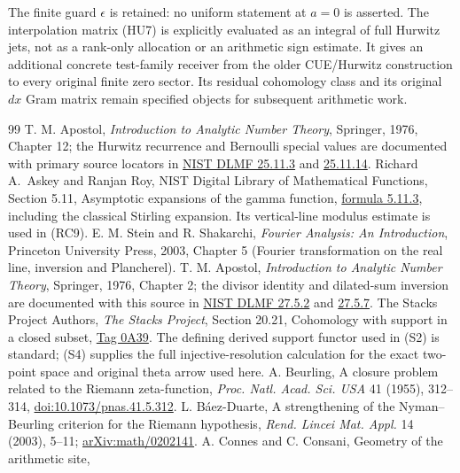 \documentclass[11pt]{article}
\begin{document}
The finite guard $\epsilon$ is retained: no uniform statement at
$a=0$ is asserted. The interpolation matrix (HU7) is explicitly
evaluated as an integral of full Hurwitz jets, not as a rank-only
allocation or an arithmetic sign estimate. It gives an additional
concrete test-family receiver from the older CUE/Hurwitz construction
to every original finite zero sector. Its residual cohomology class
and its original $dx$ Gram matrix remain specified objects for
subsequent arithmetic work.

\begin{thebibliography}{99}
 T. M. Apostol, \emph{Introduction to Analytic
Number Theory}, Springer, 1976, Chapter 12; the Hurwitz recurrence
and Bernoulli special values are documented with primary source
locators in
\href{https://dlmf.nist.gov/25.11.E3}{NIST DLMF 25.11.3} and
\href{https://dlmf.nist.gov/25.11.E14}{25.11.14}.
 Richard A.~Askey and Ranjan Roy,
NIST Digital Library of Mathematical Functions,
Section 5.11, Asymptotic expansions of the gamma function,
\href{https://dlmf.nist.gov/5.11.E3}{formula 5.11.3}, including the
classical Stirling expansion. Its vertical-line modulus estimate
is used in (RC9).
 E. M. Stein and R. Shakarchi,
\emph{Fourier Analysis: An Introduction}, Princeton University
Press, 2003, Chapter 5 (Fourier transformation on the real line,
inversion and Plancherel).
 T. M. Apostol, \emph{Introduction to Analytic
Number Theory}, Springer, 1976, Chapter 2; the divisor identity and
dilated-sum inversion are documented with this source in
\href{https://dlmf.nist.gov/27.5.E2}{NIST DLMF 27.5.2} and
\href{https://dlmf.nist.gov/27.5.E7}{27.5.7}.
 The Stacks Project Authors, \emph{The Stacks Project},
Section 20.21, Cohomology with support in a closed subset,
\href{https://stacks.math.columbia.edu/tag/0A39}{Tag 0A39}.
The defining derived support functor used in (S2) is standard;
(S4) supplies the full injective-resolution calculation for the exact
two-point space and original theta arrow used here.
 A. Beurling, A closure problem related to the Riemann
zeta-function, \emph{Proc. Natl. Acad. Sci. USA} 41 (1955), 312--314,
\href{https://doi.org/10.1073/pnas.41.5.312}{doi:10.1073/pnas.41.5.312}.
 L. B\'aez-Duarte, A strengthening of the Nyman--Beurling
criterion for the Riemann hypothesis, \emph{Rend. Lincei Mat. Appl.}
14 (2003), 5--11; \href{https://arxiv.org/abs/math/0202141}{arXiv:math/0202141}.
 A. Connes and C. Consani, Geometry of the arithmetic site,

\end{thebibliography}
\end{document}

